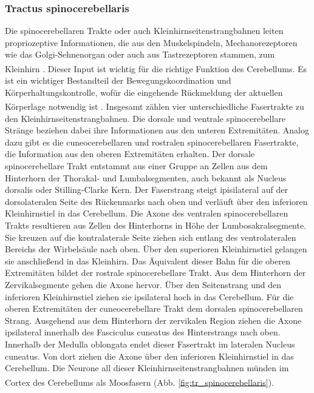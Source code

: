 \documentclass[12pt,a4paper,pdftex]{article}
\begin{document}
\subsubsection{Tractus spinocerebellaris} 
Die spinocerebellaren Trakte  oder auch Kleinhirnseitenstrangbahnen leiten propriozeptive Informationen, die aus den Muskelspindeln, Mechanorezeptoren wie das Golgi-Sehnenorgan oder auch aus Tastrezeptoren stammen, zum Kleinhirn \textsuperscript{\cite[8]{crossman2014neuroanatomy}}. Dieser Input ist wichtig für die richtige Funktion des Cerebellums. Es ist ein wichtiger Bestandteil der Bewegungskoordination und Körperhaltungskontrolle, wofür die eingehende Rückmeldung der aktuellen Körperlage notwendig ist \textsuperscript{\cite[3]{trepel2011neuroanatomie}}. Insgesamt zählen vier unterschiedliche Fasertrakte zu den Kleinhirnseitenstrangbahnen. Die dorsale und ventrale spinocerebellare Stränge beziehen dabei ihre Informationen aus den unteren Extremitäten. Analog dazu gibt es die cuneocerebellaren und rostralen spinocerebellaren Fasertrakte, die Information aus den oberen Extremitäten erhalten. Der dorsale spinocerebellare Trakt entstammt aus einer Gruppe an Zellen aus dem Hinterhorn der Thorakal- und Lumbalsegmenten, auch bekannt als Nucleus dorsalis oder Stilling-Clarke Kern. Der Faserstrang steigt ipisilateral auf der dorsolateralen Seite des Rückenmarks nach oben und verläuft über den inferioren Kleinhirnstiel in das Cerebellum. Die Axone des ventralen spinocerebellaren Trakts resultieren aus Zellen des Hinterhorns in Höhe der Lumbosakralsegmente. Sie kreuzen auf die kontralaterale Seite ziehen sich entlang des ventrolateralen Bereichs der Wirbelsäule nach oben. Über den superioren Kleinhirnstiel gelangen sie anschließend in das Kleinhirn. Das Äquivalent dieser Bahn für die oberen Extremitäten bildet der rostrale spinocerebellare Trakt. Aus dem Hinterhorn der Zervikalsegmente gehen die Axone hervor. Über den Seitenstrang und den inferioren Kleinhirnstiel ziehen sie ipsilateral hoch in das Cerebellum. Für die oberen Extremitäten der cuneocerebellare Trakt dem dorsalen spinocerebellaren Strang. Ausgehend aus dem Hinterhorn der zervikalen Region ziehen die Axone ipsilateral innerhalb des Fasciculus cuneatus des Hinterstrangs nach oben. Innerhalb der Medulla oblongata endet dieser Fasertrakt im lateralen Nucleus cuneatus. Von dort ziehen die Axone über den inferioren Kleinhirnstiel in das Cerebellum. Die Neurone all dieser Kleinhirnseitenstrangbahnen münden im Cortex des Cerebellums als Moosfasern \textsuperscript{\cite[8]{crossman2014neuroanatomy}} (Abb. \ref{fig:tr_spinocerebellaris}).          
\end{document}
